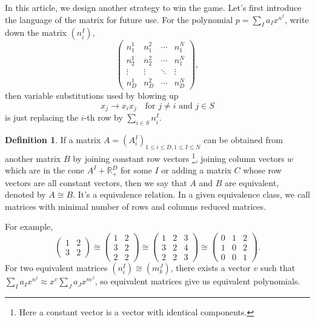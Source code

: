 \documentclass[12pt]{article}
\theoremstyle{definition}
\newtheorem{defi}[para]{Definition}
\theoremstyle{plain}
\begin{document}
In this article, we design another strategy to win the game.
Let's first introduce the language of the matrix for future use.
For the polynomial $p=\sum_I a_I x^{n^I}$, write down the matrix $(n^I_i)$, 
\[
\begin{pmatrix}
	n_1^1 & n_1^2 & \cdots & n_1^N\\
	n_2^1 & n_2^2 & \cdots & n_1^N\\
	\vdots & \vdots & \ddots & \vdots\\
	n_D^1 & n_D^2 & \cdots & n_D^N
\end{pmatrix},
\]
then variable substitutions used by blowing up
\[
	x_j\to x_ix_j \quad \text{for $j\neq i$ and $j\in S$}
\] 
is just replacing the $i$-th row by $\sum_{i\in S} n_i^I$.

\begin{defi}
If a matrix $A=(A^I_i)_{1\leq i\leq D,1\leq I\leq N}$ 
can be obtained from another matrix $B$ by joining constant row vectors%
\footnote{Here a constant vector is a vector with identical components.},
joining column vectors $w$ which are in the cone $A^I+\mathbb R_+^D$ for 
some $I$ or adding a matrix $C$ whose row vectors are all constant vectors,
then we say that $A$ and $B$ are equivalent, denoted by $A\cong B$.
It's a equivalence relation.
In a given equivalence class, we call matrices with minimal number of rows and columns 
reduced matrices.
\end{defi}

For example, 
\[
\begin{pmatrix}
	1&2\\
	3&2
\end{pmatrix}\cong 
\begin{pmatrix}
	1&2\\
	3&2\\
	2&2
\end{pmatrix}\cong
\begin{pmatrix}
	1&2&3\\
	3&2&4\\
	2&2&3
\end{pmatrix}\cong
\begin{pmatrix}
	0&1&2\\
	1&0&2\\
	0&0&1
\end{pmatrix}.
\]
For two equivalent matrices $(n^I_i)\cong (m^J_k)$, there exists a vector $v$ such that 
$\sum_I a_I x^{n^I}\approx x^v\sum_J a_J x^{m^J}$, so equivalent matrices give us
equivalent polynomials.

\vspace{2ex}
\end{document}
